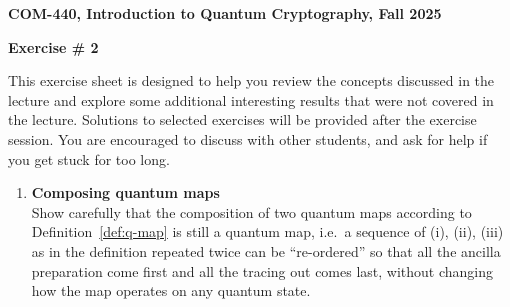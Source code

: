 \documentclass[12pt]{article}
\newcommand{\header}[1]{\begin{center} {\large\bf #1} \end{center}}
\begin{document}
\header{COM-440, Introduction to Quantum Cryptography, Fall 2025}
\header{\bf Exercise \# 2}

This exercise sheet is designed to help you review the concepts discussed in the lecture and explore some additional interesting results that were not covered in the lecture. Solutions to selected exercises will be provided after the exercise session. You are encouraged to discuss with other students, and ask for help if you get stuck for too long.

\begin{enumerate}

\item {\bf Composing quantum maps}\\
 Show carefully that the composition of two quantum maps according to Definition~\ref{def:q-map} is still a quantum map, i.e.\ a sequence of (i), (ii), (iii) as in the definition repeated twice can be ``re-ordered'' so that all the ancilla preparation come first and all the tracing out comes last, without changing how the map operates on any quantum state. 



\end{enumerate}
\end{document}
